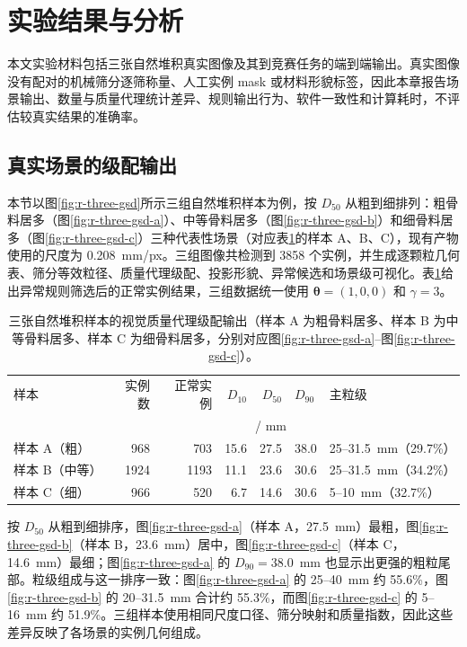 \section{实验结果与分析}
\label{sec:r-results}

本文实验材料包括三张自然堆积真实图像及其到竞赛任务的端到端输出。真实图像没有配对的机械筛分逐筛称量、人工实例 mask 或材料形貌标签，因此本章报告场景输出、数量与质量代理统计差异、规则输出行为、软件一致性和计算耗时，不评估较真实结果的准确率。

\subsection{真实场景的级配输出}

本节以图\ref{fig:r-three-gsd}所示三组自然堆积样本为例，按 $D_{50}$ 从粗到细排列：粗骨料居多（图\ref{fig:r-three-gsd-a}）、中等骨料居多（图\ref{fig:r-three-gsd-b}）和细骨料居多（图\ref{fig:r-three-gsd-c}）三种代表性场景（对应表\ref{tab:r-demo-main}的样本 A、B、C），现有产物使用的尺度为 0.208~mm/px。三组图像共检测到 3858 个实例，并生成逐颗粒几何表、筛分等效粒径、质量代理级配、投影形貌、异常候选和场景级可视化。表\ref{tab:r-demo-main}给出异常规则筛选后的正常实例结果，三组数据统一使用 $\boldsymbol{\theta}=(1,0,0)$ 和 $\gamma=3$。

\begin{table}[t]
\centering
\caption{三张自然堆积样本的视觉质量代理级配输出（样本 A 为粗骨料居多、样本 B 为中等骨料居多、样本 C 为细骨料居多，分别对应图\ref{fig:r-three-gsd-a}--图\ref{fig:r-three-gsd-c}）。}
\label{tab:r-demo-main}
\footnotesize
\renewcommand{\arraystretch}{1.12}
\begin{tabular}{lrrrrll}
\toprule
样本 & 实例数 & 正常实例 & $D_{10}$ & $D_{50}$ & $D_{90}$ & 主粒级 \\
 & & & \multicolumn{3}{c}{/ mm} & \\
\midrule
样本 A（粗） & 968 & 703 & 15.6 & 27.5 & 38.0 & 25--31.5~mm（29.7\%） \\
样本 B（中等） & 1924 & 1193 & 11.1 & 23.6 & 30.6 & 25--31.5~mm（34.2\%） \\
样本 C（细） & 966 & 520 & 6.7 & 14.6 & 30.6 & 5--10~mm（32.7\%） \\
\bottomrule
\end{tabular}
\end{table}

按 $D_{50}$ 从粗到细排序，图\ref{fig:r-three-gsd-a}（样本 A，27.5~mm）最粗，图\ref{fig:r-three-gsd-b}（样本 B，23.6~mm）居中，图\ref{fig:r-three-gsd-c}（样本 C，14.6~mm）最细；图\ref{fig:r-three-gsd-a} 的 $D_{90}=38.0$~mm 也显示出更强的粗粒尾部。粒级组成与这一排序一致：图\ref{fig:r-three-gsd-a} 的 25--40~mm 约 55.6\%，图\ref{fig:r-three-gsd-b} 的 20--31.5~mm 合计约 55.3\%，而图\ref{fig:r-three-gsd-c} 的 5--16~mm 约 51.9\%。三组样本使用相同尺度口径、筛分映射和质量指数，因此这些差异反映了各场景的实例几何组成。

